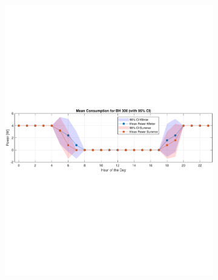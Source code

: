 \begin{figure}[H]
\begin{minipage}[t]{0.45\linewidth}
\begin{subfigure}{\linewidth}
            \includegraphics[width=\linewidth, height=\RightImageEachHeight, keepaspectratio]{photos/Mean_consumption_winter&summer_system1_with_95CI.pdf}
        \end{subfigure}
        \par\vspace{\RightImageVSpace} %
        \begin{subfigure}{\linewidth}

\end{subfigure}
\end{minipage}
\end{figure}
